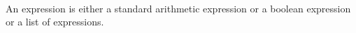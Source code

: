 \[\begin{array}{llll}
%
%
\end{array}
\]
An expression is
either a standard arithmetic expression or a boolean expression or a list of expressions.
